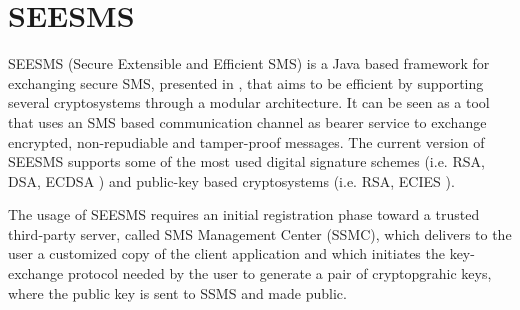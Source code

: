 \documentclass[authoryear]{elsarticle}
\begin{document}
%

\section{SEESMS}

SEESMS (Secure Extensible and Efficient SMS) is a Java based framework for exchanging secure SMS, presented in \cite{DeSantis2010}, that aims to be efficient by supporting several cryptosystems through a modular architecture.  It can be seen as a tool that uses an SMS based communication channel as bearer service to exchange encrypted, non-repudiable and tamper-proof messages. The current version of SEESMS supports some of the most used digital signature schemes (i.e. RSA, DSA, ECDSA \citep{JohnsonMV01}) and public-key based cryptosystems (i.e. RSA, ECIES \citep{sec1}). 

The usage of SEESMS requires an initial registration phase toward a trusted third-party server, called SMS Management Center (SSMC), which delivers to the user a customized copy of the client application and which initiates the key-exchange protocol needed by the user to generate a pair of cryptopgrahic  keys, where the public key is sent to SSMS and made public.
\end{document}
